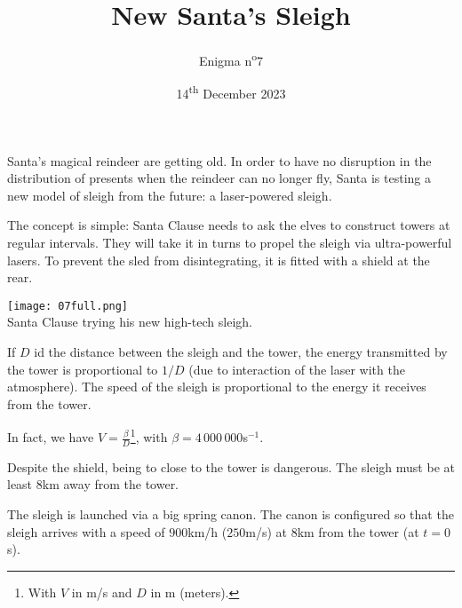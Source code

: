 \documentclass[a4paper, top=10mm]{article}
\title{\textbf{\huge{New Santa's Sleigh}}}
\author{Enigma n\textsuperscript{o}7}
\date{14\textsuperscript{th} December 2023}
\begin{document}
	\maketitle
	
	Santa's magical reindeer are getting old.
	In order to have no disruption in the distribution of presents when the reindeer can no longer fly, Santa is testing a new model of sleigh from the future: a laser-powered sleigh.
	
	The concept is simple: Santa Clause needs to ask the elves to construct towers at regular intervals.
	They will take it in turns to propel the sleigh via ultra-powerful lasers.
	To prevent the sled from disintegrating, it is fitted with a shield at the rear.
	
	\begin{center}
		\texttt{[image: 07full.png]}\\
		Santa Clause trying his new high-tech sleigh.
	\end{center}
	
	If $D$ id the distance between the sleigh and the tower, the energy transmitted by the tower is proportional to $1/D$ (due to interaction of the laser with the atmosphere).
	The speed of the sleigh is proportional to the energy it receives from the tower.
	
	In fact, we have $V = \frac{\beta}{D}$\footnote{With $V$ in m/s and $D$ in m (meters).}, with $\beta=4\,000\,000$s$ ^{-1}$.
	
	Despite the shield, being to close to the tower is dangerous.
	The sleigh must be at least $8$km away from the tower.
	
	The sleigh is launched via a big spring canon.
	The canon is configured so that the sleigh arrives with a speed of $900$km/h ($250$m/s) at $8$km from the tower (at $t=0$s).
	
	
	
\end{document}
